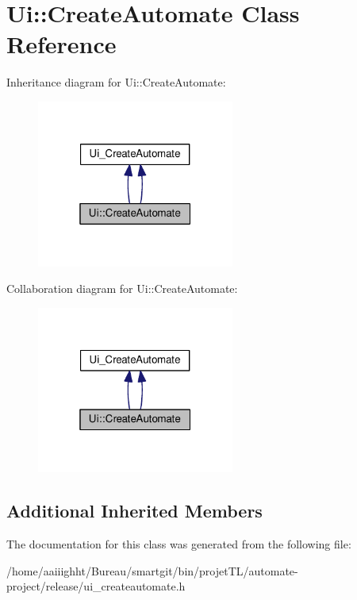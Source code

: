 \hypertarget{class_ui_1_1_create_automate}{\section{Ui\-:\-:Create\-Automate Class Reference}
\label{class_ui_1_1_create_automate}
}


Inheritance diagram for Ui\-:\-:Create\-Automate\-:
\nopagebreak
\begin{figure}[H]
\begin{center}
\leavevmode
\includegraphics[width=184pt]{class_ui_1_1_create_automate__inherit__graph}
\end{center}
\end{figure}


Collaboration diagram for Ui\-:\-:Create\-Automate\-:
\nopagebreak
\begin{figure}[H]
\begin{center}
\leavevmode
\includegraphics[width=184pt]{class_ui_1_1_create_automate__coll__graph}
\end{center}
\end{figure}
\subsection*{Additional Inherited Members}


The documentation for this class was generated from the following file\-:\begin{DoxyCompactItemize}
\item 
/home/aaiiighht/\-Bureau/smartgit/bin/projet\-T\-L/automate-\/project/release/ui\-\_\-createautomate.\-h\end{DoxyCompactItemize}
